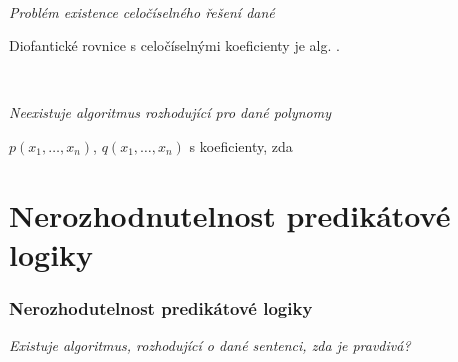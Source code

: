     \smallskip
    
     \ \ {\it Problém existence celočíselného řešení dané
    \smallskip
    
    Diofantické rovnice s celočíselnými koeficienty je alg. .}
    \medskip
    
    \smallskip
    
    {\bf {}}\ \ {\it Neexistuje algoritmus rozhodující pro dané polynomy
    \smallskip
    
    $p(x_1,\dots,x_n)$, $q(x_1,\dots,x_n)$ s  koeficienty, zda}
    
    
    
    

\section{Nerozhodnutelnost predikátové logiky}\todo

\subsubsection*{Nerozhodutelnost predikátové logiky}
{\it Existuje algoritmus, rozhodující o dané sentenci, zda je  pravdivá?} %
\smallskip

